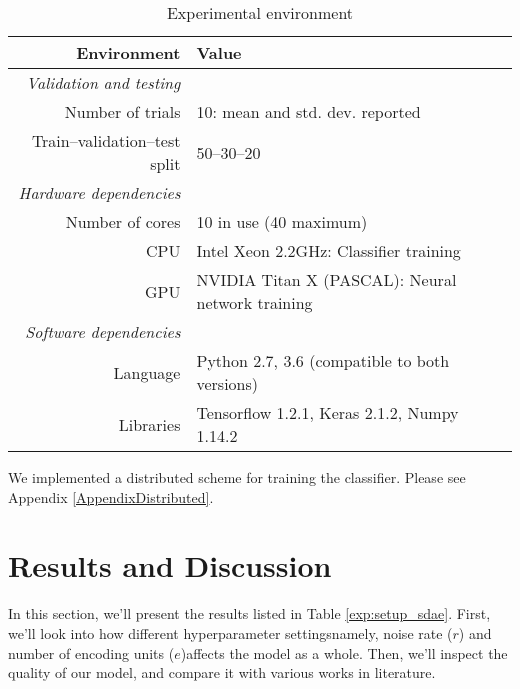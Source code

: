 \begin{table}[t]
  \centering
  \caption{Experimental environment}
  \label{exp:implementation_sdae}
  \begin{threeparttable}
  \begin{tabular}{@{}rp{}@{}}
      \toprule
      Environment                    & Value                                             \\ \midrule
      \textit{Validation and testing}                                                    \\
      Number of trials               & 10: mean and std. dev. reported                   \\
      Train--validation--test split  & 50--30--20                                        \\ \cmidrule{1-2}
      \textit{Hardware dependencies}                                                     \\
      Number of cores\tnote{1}       & 10 in use (40 maximum)                            \\
      CPU                            & Intel Xeon 2.2GHz: Classifier training            \\
      GPU                            & NVIDIA Titan X (PASCAL): Neural network training  \\ \cmidrule{1-2} 
      \textit{Software dependencies}                                                     \\
      Language                & Python 2.7, 3.6 (compatible to both versions)            \\
      Libraries               & Tensorflow 1.2.1, Keras 2.1.2, Numpy 1.14.2              \\ \bottomrule
  \end{tabular}
  \begin{tablenotes}
    \footnotesize
    \item[1] We implemented a distributed scheme for training the classifier.
    Please see Appendix \ref{AppendixDistributed}.
  \end{tablenotes}
  \end{threeparttable}
\end{table}

\section{Results and Discussion}
\label{SDResults}

In this section, we'll present the results listed in Table
\ref{exp:setup_sdae}. First, we'll look into how different hyperparameter
settings\textemdash namely, noise rate ($r$) and number of encoding units
($e$)\textemdash affects the model as a whole. Then, we'll inspect the
quality of our model, and compare it with various works in literature.


